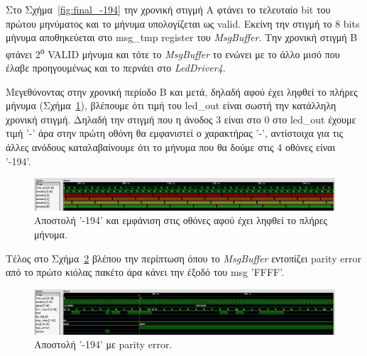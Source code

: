 \documentclass[../main.tex]{subfiles}
\begin{document}
Στο Σχήμα~\ref{fig:final_-194} την χρονική στιγμή A φτάνει το τελευταίο bit του
πρώτου μηνύματος και το μήνυμα υπολογίζεται ως valid. Εκείνη την στιγμή το 8
bits μήνυμα αποθηκεύεται στο msg\_tmp register του \textit{MsgBuffer}. Την
χρονική στιγμή B φτάνει 2\textsuperscript{ο} VALID μήνυμα και τότε το
\textit{MsgBuffer} το ενώνει με το άλλο μισό που έλαβε προηγουμένως και το
περνάει στο \textit{LedDriver4}.

Μεγεθύνοντας στην χρονική περίοδο B και μετά, δηλαδή αφού έχει ληφθεί το πλήρες
μήνυμα (Σχήμα~\ref{fig:final_ledout}), βλέπουμε ότι τιμή του led\_out είναι
σωστή την κατάλληλη χρονική στιγμή. Δηλαδή την στιγμή που η άνοδος 3 είναι στο 0
στο led\_out έχουμε τιμή '-' άρα στην πρώτη οθόνη θα εμφανιστεί ο χαρακτήρας
'-', αντίστοιχα για τις άλλες ανόδους καταλαβαίνουμε ότι το μήνυμα που θα δούμε
στις 4 οθόνες είναι '-194'.

\begin{figure}[H]
  \begin{center}
    \includegraphics[width=\textwidth]{../images/mymodule_ledout.png}
  \end{center}
  \caption{Αποστολή '-194' και εμφάνιση στις οθόνες αφού έχει ληφθεί το πλήρες
  μήνυμα.}
  \label{fig:final_ledout}
\end{figure}

Τέλος στο Σχήμα~\ref{fig:final_parity_error} βλέπου την περίπτωση όπου το
\textit{MsgBuffer} εντοπίζει parity error από το πρώτο κιόλας πακέτο άρα κάνει
την έξοδό του msg 'FFFF'.

\begin{figure}[H]
  \begin{center}
    \includegraphics[width=\textwidth]{../images/final_parity_error.png}
  \end{center}
  \caption{Αποστολή '-194' με parity error.}
  \label{fig:final_parity_error}
\end{figure}
\end{document}
